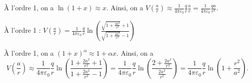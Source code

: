 
\begin{corrige}
	À l'ordre 1, on a $\ln\left(1+x\right) \approx  x$. Ainsi,  on a  
	$
		V\left(\frac{a}{r}\right) \approx \frac{1}{4\pi\varepsilon_0} \frac{q}{r} \frac{a}{r} = \frac{1}{4\pi\varepsilon_0} \frac{qa}{r^2}
	$.
\end{corrige}






\begin{enonce}
	À l'ordre 1 : $V\left(\frac{a}{r}\right) = \frac{1}{4\pi\varepsilon_0} \frac{q}{r} \ln \left( \frac{ \sqrt{1 + \frac{4a^2}{r^2}} + 1 }{ \sqrt{1 + \frac{4a^2}{r^2}} - 1 } \right)$
\end{enonce}


\begin{corrige}
	À l'ordre 1, on a $\left(1+x\right)^{\alpha} \approx  1 + \alpha x$. Ainsi, on a 
	\[
		V\left(\frac{a}{r}\right) \approx \frac{1}{4\pi\varepsilon_0} \frac{q}{r} \ln \left( \frac{ 1 + \frac{2a^2}{r^2} + 1 }{ 1 + \frac{2a^2}{r^2} - 1 } \right) = \frac{1}{4\pi\varepsilon_0} \frac{q}{r} \ln \left( \frac{2 + \frac{2a^2}{r^2}}{\frac{2a^2}{r^2}} \right) = \frac{1}{4\pi\varepsilon_0} \frac{q}{r}\ln \left( 1 + \frac{r^2}{a^2} \right).
	\]
\end{corrige}



\finEntrainement







\hauteurLargeurCadreReponse		{7mm}{7cm}
\initialisationEntrainement

